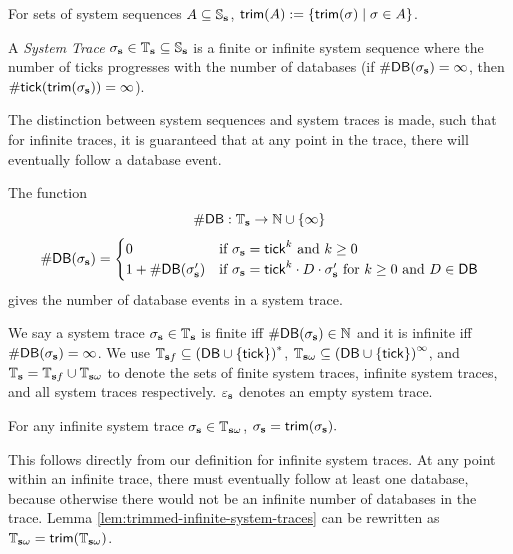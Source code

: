 For sets of system sequences $A \subseteq \mathbb{S}_{\mathbf{s}}$, 
$\mathsf{trim}(A) := \{ \mathsf{trim}(\sigma) \mid \sigma \in A \}$.

\begin{definition}
    \label{def:system-trace}
    A \emph{System Trace}
    $\sigma_{\mathbf{s}} \in \mathbb{T}_{\mathbf{s}} \subseteq \mathbb{S}_{\mathbf{s}}$ 
    is a finite or infinite system sequence where
    the number of ticks progresses with the number of databases
    (if $\mathsf{\#DB}(\sigma_{\mathbf{s}}) = \infty$, then
    $\mathsf{\#tick}(\mathsf{trim}(\sigma_{\mathbf{s}})) = \infty $).
\end{definition}

The distinction between system sequences and system
traces is made, such that for infinite traces, it
is guaranteed that at any point in the trace, there
will eventually follow a database event.

\begin{definition}
    \label{def:num-db}
    The function
    \vspace{-1em}
    \begin{equation*}
        \mathsf{\#DB} : \mathbb{T}_{\mathbf{s}} \to \mathbb{N} \cup \{ \infty \}
    \end{equation*}
    \vspace{-2em}
    \begin{align*}
        \mathsf{\#DB}(\sigma_{\mathbf{s}}) =
        \begin{cases}
            0 &\text{if } \sigma_{\mathbf{s}} = \mathsf{tick}^k \text{ and } k \geq 0 \\
            1 + \mathsf{\#DB}(\sigma'_{\mathbf{s}})
                &\text{if } \sigma_{\mathbf{s}} = \mathsf{tick}^k \cdot D \cdot \sigma'_{\mathbf{s}}
                \text{ for } k \geq 0
                \text{ and } D \in \mathsf{DB}
        \end{cases}
    \end{align*}
    gives the number of database events in a system trace.
\end{definition}


We say a system trace $\sigma_{\mathbf{s}} \in \mathbb{T}_{\mathbf{s}}$
is finite iff $\mathsf{\#DB}(\sigma_{\mathbf{s}}) \in \mathbb{N}$
and it is infinite iff $\mathsf{\#DB}(\sigma_{\mathbf{s}}) = \infty$.
We use
$\mathbb{T}_{\mathbf{s} f} \subseteq 
\left( \mathsf{DB} \cup \left\{\mathsf{tick} \right\} \right)^*$,
$\mathbb{T}_{\mathbf{s} \omega} \subseteq
\left( \mathsf{DB} \cup \left\{\mathsf{tick} \right\} \right)^\infty$,
and
$\mathbb{T}_{\mathbf{s}} = 
\mathbb{T}_{\mathbf{s} f} \cup \mathbb{T}_{\mathbf{s} \omega}$
to denote the sets of finite system traces, infinite system traces,
and all system traces respectively.
$\varepsilon_{\mathbf{s}}$ denotes an empty system
trace.

\begin{lemma}
    \label{lem:trimmed-infinite-system-traces}
    For any infinite system trace $\sigma_{\mathbf{s}} \in \mathbb{T}_{\mathbf{s} \omega}$,
    $\sigma_{\mathbf{s}} = \mathsf{trim}(\sigma_{\mathbf{s}}).$
\end{lemma}
This follows directly from our definition for infinite system traces.
At any point within an infinite trace, there must eventually follow
at least one database, because otherwise there would not
be an infinite number of databases in the trace.
Lemma \ref{lem:trimmed-infinite-system-traces} can be rewritten as
$\mathbb{T}_{\mathbf{s} \omega} = \mathsf{trim}(\mathbb{T}_{\mathbf{s} \omega})$.


